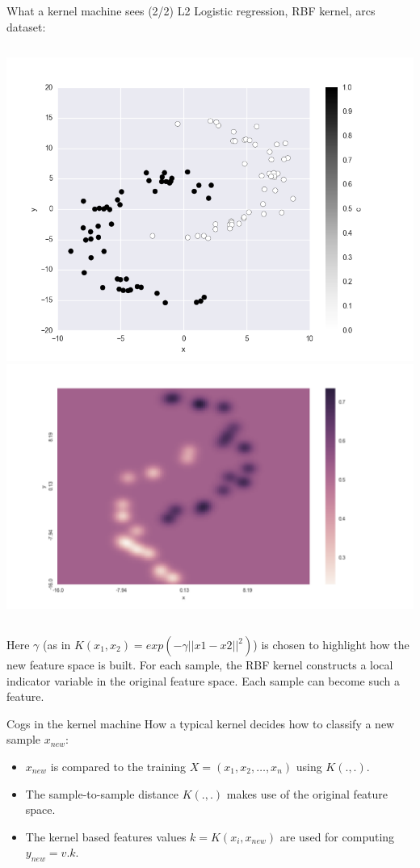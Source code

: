 \documentclass[11pt]{beamer}
\begin{document}
\begin{frame}{What a kernel machine sees (2/2) }
L2 Logistic regression, RBF kernel, arcs dataset:
\begin{columns}
\includegraphics[scale=0.25]{arcs_labels.png} 
\includegraphics[scale=0.2]{arcs_lenses.png} 
\end{columns}
Here $\gamma$ (as in $K(x_1, x_2) = exp(-\gamma ||x1 - x2||^2)$) is chosen to highlight how the new feature space is built.
For each sample, the RBF kernel constructs a local indicator variable in the original feature space.
Each sample can become such a feature.
\end{frame}


\begin{frame}{Cogs in the kernel machine}
How a typical kernel decides how to classify a new sample $x_{new}$:
\begin{itemize}
\item $x_{new}$ is compared to the training $X = (x_1, x_2, \dots, x_n)$ using $K(., .)$.
\item The sample-to-sample distance $K(., .)$ makes use of the original feature space.
\item The kernel based features values $k = K(x_i, x_{new})$ are used for computing $y_{new} = v . k$. 
\end{itemize} 
\end{frame}
\end{document}

